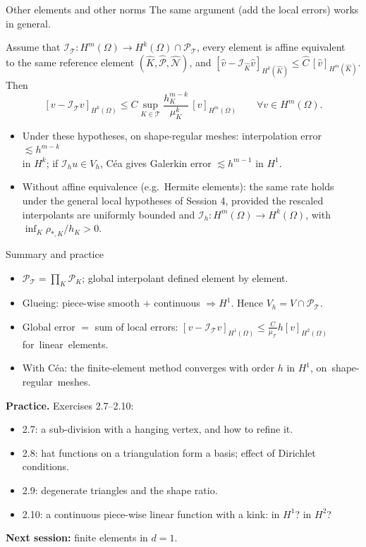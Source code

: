 \begin{frame}{Other elements and other norms}
    The same argument (add the local errors) works in general.
    \begin{theorem}
        Assume that $\mathcal I_{\mathcal T}: H^m(\Omega) \to H^k(\Omega) \cap \mathcal P_{\mathcal T}$, every element is affine equivalent\\ to the same reference element $(\widehat K, \widehat{\mathcal P}, \widehat{\mathcal N})$, and
        $[\widehat v - \mathcal I_{\widehat K} \widehat v]_{H^k(\widehat K)} \le \widehat C\, [\widehat v]_{H^m(\widehat K)}$. Then
        \[
            [v - \mathcal I_{\mathcal T} v]_{H^k(\Omega)} \le C \sup_{K \in \mathcal T} \frac{h_K^{m-k}}{\mu_K^k}\, [v]_{H^m(\Omega)} \qquad \forall v \in H^m(\Omega).
        \]
    \end{theorem}
    \begin{itemize}
        \item Under these hypotheses, on shape-regular meshes: interpolation error $\lesssim h^{m-k}$\\ in $H^k$; if $\mathcal I_hu\in V_h$, Céa gives Galerkin error $\lesssim h^{m-1}$ in $H^1$.
        \item Without affine equivalence (e.g.\ Hermite elements): the same rate holds under the general local hypotheses of Session 4, provided the rescaled interpolants are uniformly bounded and $\mathcal I_h:H^m(\Omega)\to H^k(\Omega)$, with $\inf_K\rho_{*,K}/h_K>0$.
    \end{itemize}
\end{frame}

\begin{frame}{Summary and practice}
    \begin{itemize}
        \item $\mathcal P_{\mathcal T} = \prod_K \mathcal P_K$; global interpolant defined element by element.
        \item Glueing: piece-wise smooth $+$ continuous $\Rightarrow H^1$. Hence $V_h = V \cap \mathcal P_{\mathcal T}$.
        \item Global error $=$ sum of local errors: $[v - \mathcal I_{\mathcal T} v]_{H^1(\Omega)} \le \frac{C}{\mu_{\mathcal T}} h [v]_{H^2(\Omega)}$ \mbox{for linear elements.}
        \item With Céa: the finite-element method converges with order $h$ in $H^1$, \mbox{on shape-regular meshes.}
    \end{itemize}
    \bigskip
    \textbf{Practice.} Exercises 2.7--2.10:
    \begin{itemize}
        \item 2.7: a sub-division with a hanging vertex, and how to refine it.
        \item 2.8: hat functions on a triangulation form a basis; effect of Dirichlet conditions.
        \item 2.9: degenerate triangles and the shape ratio.
        \item 2.10: a continuous piece-wise linear function with a kink: in $H^1$? in $H^2$?
    \end{itemize}
    \bigskip
    \textbf{Next session:} finite elements in $d = 1$.
\end{frame}
